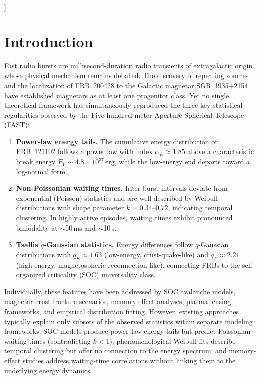 \documentclass[twocolumn]{article}
\newcommand{\frb}[1]{FRB~#1}
\newcommand{\erg}{\,\mathrm{erg}}
\begin{document}
\vspace{12pt}
\twocolumn
]

\section{Introduction}

Fast radio bursts are millisecond-duration radio transients of extragalactic origin whose physical mechanism remains debated\cite{lorimer2007,petroff2022}. The discovery of repeating sources\cite{spitler2016} and the localization of \frb{200428} to the Galactic magnetar SGR~1935+2154\cite{bochenek2020,chime2020sgr} have established magnetars as at least one progenitor class. Yet no single theoretical framework has simultaneously reproduced the three key statistical regularities observed by the Five-hundred-meter Aperture Spherical Telescope (FAST)\cite{nan2011}:

\begin{enumerate}
\item \textbf{Power-law energy tails.} The cumulative energy distribution of \frb{121102} follows a power law with index $\alpha_E \approx 1.85$ above a characteristic break energy $E_0 \sim 4.8 \times 10^{37}\erg$, while the low-energy end departs toward a log-normal form\cite{li2021}.

\item \textbf{Non-Poissonian waiting times.} Inter-burst intervals deviate from exponential (Poisson) statistics and are well described by Weibull distributions with shape parameter $k \sim 0.34$--$0.72$, indicating temporal clustering\cite{li2021,xu2022}. In highly active episodes, waiting times exhibit pronounced bimodality at $\sim$50\,ms and $\sim$10\,s\cite{xu2022,zhang2022}.

\item \textbf{Tsallis $q$-Gaussian statistics.} Energy differences follow $q$-Gaussian distributions with $q_E \approx 1.63$ (low-energy, crust-quake-like) and $q_E \approx 2.21$ (high-energy, magnetospheric reconnection-like)\cite{lin2019,sang2022}, connecting FRBs to the self-organized criticality (SOC) universality class.
\end{enumerate}

Individually, these features have been addressed by SOC avalanche models\cite{wang2017,aschwanden2016}, magnetar crust fracture scenarios\cite{cheng2020,wadiasingh2019}, memory-effect analyses\cite{cruces2023,tabor2024}, plasma lensing frameworks\cite{li2024plasma}, and empirical distribution fitting\cite{lu2020,gourdji2019}. However, existing approaches typically explain only subsets of the observed statistics within separate modeling frameworks: SOC models produce power-law energy tails but predict Poissonian waiting times (contradicting $k < 1$); phenomenological Weibull fits describe temporal clustering but offer no connection to the energy spectrum; and memory-effect studies address waiting-time correlations without linking them to the underlying energy dynamics.
\end{document}
